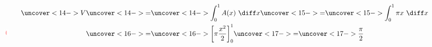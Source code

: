 \begin{frame}
\begin{example}
\begin{columns}[c]
\begin{center}
{\includegraphics[height=3.5cm]{volumes/pictures/06-02-ex2d.pdf} %
}%
%
%
%
\end{center}
\abovedisplayskip=0pt
\belowdisplayskip=0pt
\abovedisplayshortskip=0pt
\belowdisplayshortskip=0pt
\begin{align*}
\uncover<14->{%
V%
}%
& \uncover<14->{ = } %
\uncover<14->{%
\int_0^1 A(x) \ \diff x%
}%
 \uncover<15->{ = } %
\uncover<15->{%
\int_0^1 \pi x \ \diff x%
}\\%
& \uncover<16->{ = } %
\uncover<16->{%
\left[ \pi \frac{x^2}{2}\right]_0^1%
}%
 \uncover<17->{ = } %
\uncover<17->{%
\frac{\pi}{2}%
}%
\end{align*}
\end{columns}
\end{example}
\end{frame}

